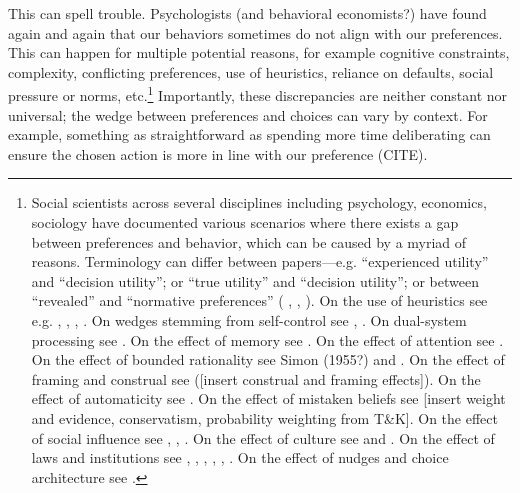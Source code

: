 \documentclass[12pt,letterpaper]{article}
\begin{document}
This can spell trouble. Psychologists (and behavioral economists?) have found again and again that our behaviors sometimes do not align with our preferences. This can happen for multiple potential reasons, for example cognitive constraints, complexity, conflicting preferences, use of heuristics, reliance on defaults, social pressure or norms, etc.\footnote{Social scientists across several disciplines including psychology, economics, sociology have documented various scenarios where there exists a gap between preferences and behavior, which can be caused by a myriad of reasons. Terminology can differ between papers---e.g. “experienced utility” and “decision utility”; or “true utility” and “decision utility”; or between “revealed” and “normative preferences” ( \citealt{kahneman1991economic}, \citealt{beshears2008preferences}, \citealt{bernheim2009beyond}). On the use of heuristics see e.g. \citealt{tversky1974judgment}, \citealt{shah2008heuristics}, \citealt{gigerenzer2008heuristics}, \citealt{bordalo2016stereotypes}. On wedges stemming from self-control see \citealt{mischel1989delay}, \citealt{kruglanski2002theory}. On dual-system processing see \citealt{kahneman2011thinking}. On the effect of memory see \citealt{stewart2006decision}. On the effect of attention see \citealt{gabaix2019behavioral}. On the effect of bounded rationality see Simon (1955?) and \citealt{conlisk1996bounded}. On the effect of framing and construal see ([insert construal and framing effects]). On the effect of automaticity see \citealt{dijksterhuis2006making}. On the effect of mistaken beliefs see \citealt{benjamin2019errors} [insert weight and evidence, conservatism, probability weighting from T\&K]. On the effect of social influence see \citealt{asch1951effects}, \citealt{milgram1978obedience}, \citealt{cialdini2004social}. On the effect of culture see \citealt{yamagishi2008preferences} and \citealt{henrich2010beyond}. On the effect of laws and institutions see \citealt{feagin1980discrimination}, \citealt{massey1993american}, \citealt{pager2008sociology}, \citealt{reskin2012race}, \citealt{small2020sociological}, \citealt{north1991institutions}. On the effect of nudges and choice architecture see \citealt{thaler2009nudge}.} Importantly, these discrepancies are neither constant nor universal; the wedge between preferences and choices can vary by context. For example, something as straightforward as spending more time deliberating can ensure the chosen action is more in line with our preference (CITE). 

\end{document}
